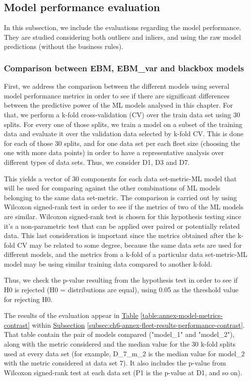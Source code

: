 \subsection{Model performance evaluation}\label{subsec:ch6-eval-model-performance}
In this subsection, we include the evaluations regarding the model performance. They are studied 
considering both outliers and inliers, and using the raw model predictions (without the business rules).

\subsubsection{Comparison between EBM, EBM\_var and blackbox models}\label{subsubsec:ch6-comparison-vs-blackbox}
First, we address the comparison between the different models using several model performance metrics in order to see if there are significant differences between the predictive power of the ML models analysed in this chapter. For that, we perform a k-fold cross-validation (CV) over the train data set using 30 splits. For every one of those splits, we train a model on a subset of the training data and evaluate it over the validation data selected by k-fold CV. This is done for each of those 30 splits, and for one data set per each fleet size (choosing the one with more data points) in order to have a representative analysis over different types of data sets. Thus, we consider D1, D3 and D7. 

This yields a vector of 30 components for each data set-metric-ML model that will be used for comparing against the other combinations of ML models belonging to the same data set-metric. The comparison is carried out by using Wilcoxon signed-rank test \parencite{wilcoxon1992individual} in order to see if the metrics of two of the ML models are similar. Wilcoxon signed-rank test is chosen for this hypothesis testing since it's a non-parametric test that can be applied over paired or potentially related data. This last consideration is important since the metrics obtained after the k-fold CV may be related to some degree, because the same data sets are used for different models, and the metrics from a k-fold of a particular data set-metric-ML model may be using similar training data compared to another k-fold.

Thus, we check the p-value resulting from the hypothesis test in order to see if H0 is rejected (H0 = distributions are equal), using 0.05 as the threshold value for rejecting H0.

The results of the evaluation appear in \hyperref[table:annex-model-metrics-contrast]{Table} \ref{table:annex-model-metrics-contrast} within \hyperref[subsec:ch6-annex-fleet-results-performance-contrast]{Subsection} \ref{subsec:ch6-annex-fleet-results-performance-contrast}. That table contain the pair of models compared ("model\_1" and "model\_2"), along with the metric considered and the median value  for the 30 k-fold splits used at every data set (for example,  D\_7\_m\_2 is the median value for model\_2 with the metric considered at data set 7). It also includes the p-value from Wilcoxon signed-rank test at each data set (P1 is the p-value at D1, and so on). 


